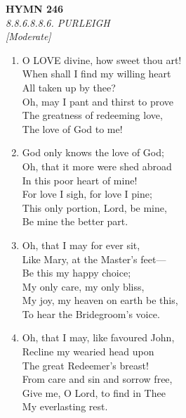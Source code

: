 \documentclass[11pt,a4paper]{article}
\begin{document}
\newpage
\begin{center}
    {\Large \textbf{HYMN 246}}
    \\
    \textit{8.8.6.8.8.6. PURLEIGH}
    \\
    \textit{\small [Moderate]}
\end{center}
\vspace{1em}

\begin{enumerate}
    \item O LOVE divine, how sweet thou art! \\
        When shall I find my willing heart \\
            All taken up by thee? \\
        Oh, may I pant and thirst to prove \\
        The greatness of redeeming love, \\
            The love of God to me!

    \item God only knows the love of God; \\
        Oh, that it more were shed abroad \\
            In this poor heart of mine! \\
        For love I sigh, for love I pine; \\
        This only portion, Lord, be mine, \\
            Be mine the better part.

    \item Oh, that I may for ever sit, \\
        Like Mary, at the Master's feet--- \\
            Be this my happy choice; \\
        My only care, my only bliss, \\
        My joy, my heaven on earth be this, \\
            To hear the Bridegroom's voice.

    \item Oh, that I may, like favoured John, \\
        Recline my wearied head upon \\
            The great Redeemer's breast! \\
        From care and sin and sorrow free, \\
        Give me, O Lord, to find in Thee \\
            My everlasting rest.

\end{enumerate}
\end{document}
